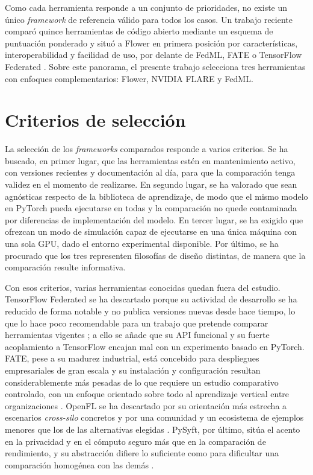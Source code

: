 Como cada herramienta responde a un conjunto de prioridades, no existe un único
\textit{framework} de referencia válido para todos los casos. Un trabajo reciente comparó
quince herramientas de código abierto mediante un esquema de puntuación ponderado y situó
a Flower en primera posición por características, interoperabilidad y facilidad de uso, por
delante de FedML, FATE o TensorFlow Federated \parencite{riedel2024comparative}. Sobre
este panorama, el presente trabajo selecciona tres herramientas con enfoques
complementarios: Flower, NVIDIA FLARE y FedML.

\section{Criterios de selección}\label{sec:criterios-seleccion}

La selección de los \textit{frameworks} comparados responde a varios criterios. Se ha
buscado, en primer lugar, que las herramientas estén en mantenimiento activo, con
versiones recientes y documentación al día, para que la comparación tenga validez en el
momento de realizarse. En segundo lugar, se ha valorado que sean agnósticas respecto de
la biblioteca de aprendizaje, de modo que el mismo modelo en PyTorch pueda ejecutarse en
todas y la comparación no quede contaminada por diferencias de implementación del modelo.
En tercer lugar, se ha exigido que ofrezcan un modo de simulación capaz de ejecutarse en
una única máquina con una sola GPU, dado el entorno experimental disponible. Por último,
se ha procurado que los tres representen filosofías de diseño distintas, de manera que la
comparación resulte informativa.

Con esos criterios, varias herramientas conocidas quedan fuera del estudio. TensorFlow
Federated se ha descartado porque su actividad de desarrollo se ha reducido de forma
notable y no publica versiones nuevas desde hace tiempo, lo que lo hace poco recomendable
para un trabajo que pretende comparar herramientas vigentes \parencite{tff2019}; a ello se
añade que su API funcional y su fuerte acoplamiento a TensorFlow encajan mal con un
experimento basado en PyTorch. FATE, pese a su madurez industrial, está concebido para
despliegues empresariales de gran escala y su instalación y configuración resultan
considerablemente más pesadas de lo que requiere un estudio comparativo controlado, con
un enfoque orientado sobre todo al aprendizaje vertical entre organizaciones
\parencite{liu2021fate}. OpenFL se ha descartado por su orientación más estrecha a
escenarios \textit{cross-silo} concretos y por una comunidad y un ecosistema de ejemplos
menores que los de las alternativas elegidas \parencite{reina2021openfl}. PySyft, por
último, sitúa el acento en la privacidad y en el cómputo seguro más que en la comparación
de rendimiento, y su abstracción difiere lo suficiente como para dificultar una
comparación homogénea con las demás \parencite{ryffel2018generic}.

